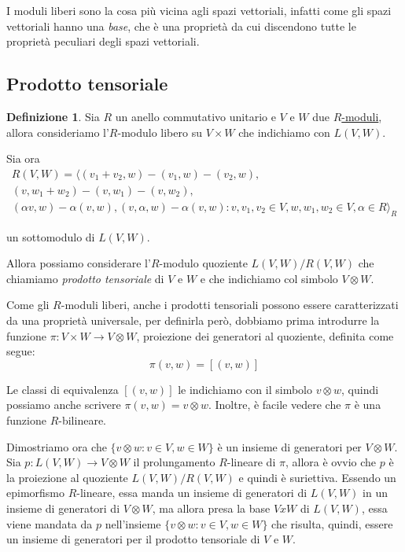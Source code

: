 \documentclass[12pt, a4paper]{article}
\theoremstyle{definition}
\newtheorem{defi}{Definizione}
\begin{document}
I moduli liberi sono la cosa più vicina agli spazi vettoriali, infatti come gli spazi vettoriali hanno una \emph{base}, che è una proprietà da cui discendono tutte le proprietà
peculiari degli spazi vettoriali.

\subsection{Prodotto tensoriale} \label{sec:prodotto-tensoriale}
\begin{defi}
\label{def: prodotto-tensoriale}
Sia $R$ un anello commutativo unitario e $V$ e $W$ due \hyperref[sec:modulo-libero]{$R$-moduli}, allora consideriamo l'$R$-modulo libero su $V \times W$ che indichiamo con $L(V, W)$.

Sia ora
\begin{multline}
R(V, W) = \langle (v_1 + v_2, w) - (v_1, w) - (v_2, w), \\
(v, w_1 + w_2) - (v, w_1) - (v, w_2), \\
(\alpha v, w) - \alpha (v, w), (v, \alpha, w) - \alpha (v, w) : v, v_1, v_2 \in V, w, w_1, w_2 \in V, \alpha \in R \rangle_R
\end{multline}

un sottomodulo di $L(V, W)$.

Allora possiamo considerare l'$R$-modulo quoziente $L(V, W)/R(V, W)$ che chiamiamo \emph{prodotto tensoriale} di $V$ e $W$ e che indichiamo col simbolo $V \otimes W$.
\end{defi}

Come gli $R$-moduli liberi, anche i prodotti tensoriali possono essere caratterizzati da una proprietà universale, per definirla però, dobbiamo prima introdurre la funzione
$\pi : V \times W \to V \otimes W$, proiezione dei generatori al quoziente, definita come segue:
$$\pi(v, w) = [(v, w)]$$

Le classi di equivalenza $[(v, w)]$ le indichiamo con il simbolo $v \otimes w$, quindi possiamo anche scrivere $\pi(v, w) = v \otimes w$. Inoltre, è facile vedere che $\pi$
è una funzione $R$-bilineare.

Dimostriamo ora che $\{ v \otimes w : v \in V, w \in W \}$ è un insieme di generatori per $V \otimes W$. Sia $p : L(V, W) \to V \otimes W$ il prolungamento $R$-lineare di $\pi$,
allora è ovvio che $p$ è la proiezione al quoziente $L(V, W)/R(V, W)$ e quindi è suriettiva. Essendo un epimorfismo $R$-lineare, essa manda un insieme di generatori di $L(V, W)$
in un insieme di generatori di $V \otimes W$, ma allora presa la base $V x W$ di $L(V, W)$, essa viene mandata da $p$ nell'insieme $\{ v \otimes w : v \in V, w \in W \}$
che risulta, quindi, essere un insieme di generatori per il prodotto tensoriale di $V$ e $W$.
\end{document}
